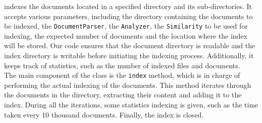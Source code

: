 indexes the documents located in a specified directory and its sub-directories. It accepts various parameters, including the directory containing the documents to be indexed, the \texttt{DocumentParser}, the \texttt{Analyzer}, the \texttt{Similarity} to be used for indexing, the expected number of documents and the location where the index will be stored. Our code ensures that the document directory is readable and the index directory is writable before initiating the indexing process. Additionally, it keeps track of statistics, such as the number of indexed files and documents. \\
The main component of the class is the \texttt{index} method, which is in charge of performing the actual indexing of the documents. This method iterates through the documents in the directory, extracting their content and adding it to the index. During all the iterations, some statistics indexing is given, such as the time taken every 10 thousand documents. Finally, the index is closed.